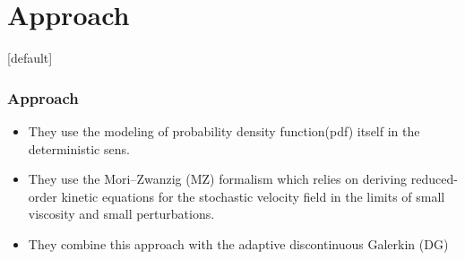 \documentclass{beamer}
\makeatletter
\newenvironment{withoutheadline}{
        \setbeamertemplate{headline}[default]
        \def\beamer@entrycode{\vspace*{-\headheight}}
    }{}
\makeatother
\begin{document}
\section{Approach}
\begin{withoutheadline}

\begin{frame} \frametitle{Approach}

\begin{itemize}
\item They use the modeling of probability density function(pdf) itself in the deterministic sens.
\item They use the Mori–Zwanzig (MZ) formalism which relies on deriving
reduced-order kinetic equations for the stochastic velocity field in the limits of small viscosity and small perturbations.
\item They combine this approach with the adaptive discontinuous Galerkin (DG)

\end{itemize}

\end{frame}
\end{withoutheadline}
\end{document}
